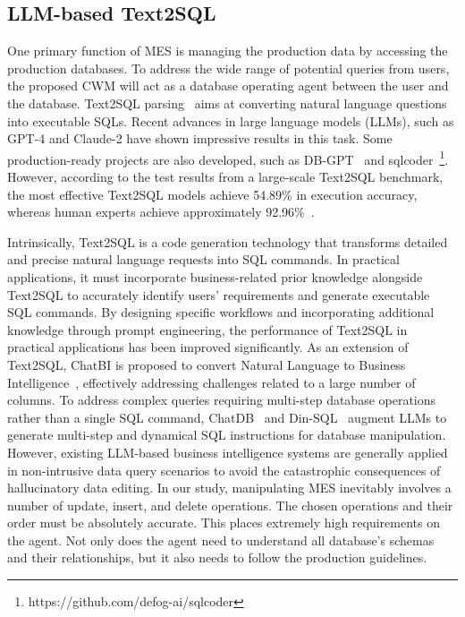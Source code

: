 \documentclass[preprint,12pt]{elsarticle}
\begin{document}
\subsection{LLM-based Text2SQL}
One primary function of MES is managing the production data by accessing the production databases. 
To address the wide range of potential queries from users, the proposed CWM will act as a database operating agent between the user and the database. 
Text2SQL parsing~\cite{li2024codes} aims at converting natural language questions into executable SQLs. 
Recent advances in large language models (LLMs), such as GPT-4 and Claude-2 have shown impressive results in this task. Some production-ready projects are also developed, such as DB-GPT~\cite{xue2023dbgpt} and sqlcoder~\footnote{https://github.com/defog-ai/sqlcoder}.
However, according to the test results from a large-scale Text2SQL benchmark, the most effective Text2SQL models achieve 54.89\% in execution accuracy, whereas human experts achieve approximately 92.96\%~\cite{li2024can}. 

Intrinsically, Text2SQL is a code generation technology that transforms detailed and precise natural language requests into SQL commands. 
In practical applications, it must incorporate business-related prior knowledge alongside Text2SQL to accurately identify users' requirements and generate executable SQL commands.
By designing specific workflows and incorporating additional knowledge through prompt engineering, the performance of Text2SQL in practical applications has been improved significantly. 
As an extension of Text2SQL, ChatBI is proposed to convert Natural Language to Business Intelligence~\cite{lian2024chatbi}, effectively addressing challenges related to a large number of columns. 
To address complex queries requiring multi-step database operations rather than a single SQL command, ChatDB~\cite{hu2023chatdb} and Din-SQL~\cite{pourreza2024din} augment LLMs to generate multi-step and dynamical SQL instructions for database manipulation. 
However, existing LLM-based business intelligence systems are generally applied in non-intrusive data query scenarios to avoid the catastrophic consequences of hallucinatory data editing.
In our study, manipulating MES inevitably involves a number of update, insert, and delete operations. 
The chosen operations and their order must be absolutely accurate. 
This places extremely high requirements on the agent. 
Not only does the agent need to understand all database's schemas and their relationships, but it also needs to follow the production guidelines.
\end{document}
